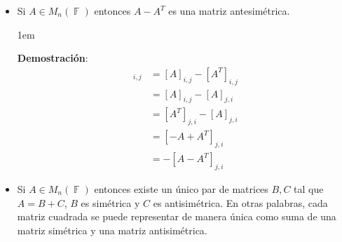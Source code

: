 \documentclass[12pt, fleqn]{report}                             %
\newenvironment{SmallIndentation}[1][0.75em]                    %
        {\begin{adjustwidth}{#1}{}\begin{footnotesize}}             %
        {\end{footnotesize}\end{adjustwidth}}                       %
\theoremstyle{break}                                            %
\DeclareMathOperator \GenericField {\mathbb{F}}                 %
\begin{document}
\begin{itemize}
                            \begin{SmallIndentation}[1em]
                                \textbf{Demostración}:
                                \begin{align*}
                                    [A + A^T]_{i,j}  
                                        &=  [A]_{i,j} + [A^T]_{i,j}     \\ 
                                        &=  [A]_{i,j} + [A]_{j,i}       \\
                                        &=  [A^T]_{j,i} + [A]_{j,i}     \\
                                        &=  [A]_{j,i} + [A^T]_{j, i}    \\
                                        &=  [A + A^T]_{j, i}             
                                \end{align*}

                            \end{SmallIndentation}

                        \item Si $A \in M_{n}(\GenericField)$ entonces $A-A^T$ es una matriz antesimétrica. 

                            \begin{SmallIndentation}[1em]
                                \textbf{Demostración}:
                                \begin{align*}
                                    [A-A^T]_{i,j}   
                                        &=  [A]_{i,j} - [A^T]_{i,j}     \\ 
                                        &=  [A]_{i,j} - [A]_{j,i}       \\
                                        &=  [A^T]_{j,i} - [A]_{j,i}     \\
                                        &=  [-A+A^T]_{j, i}             \\
                                        &= -[A - A^T]_{j, i}
                                \end{align*}

                            \end{SmallIndentation}


                        \item Si $A \in M_{n}(\GenericField)$ entonces existe un único par de matrices $B,C$
                            tal que $A = B + C$, $B$ es simétrica y $C$ es antisimétrica. 
                            En otras palabras, cada matriz cuadrada se puede representar de manera única
                            como suma de una matriz simétrica y una matriz antisimétrica.


\end{itemize}
\end{document}
